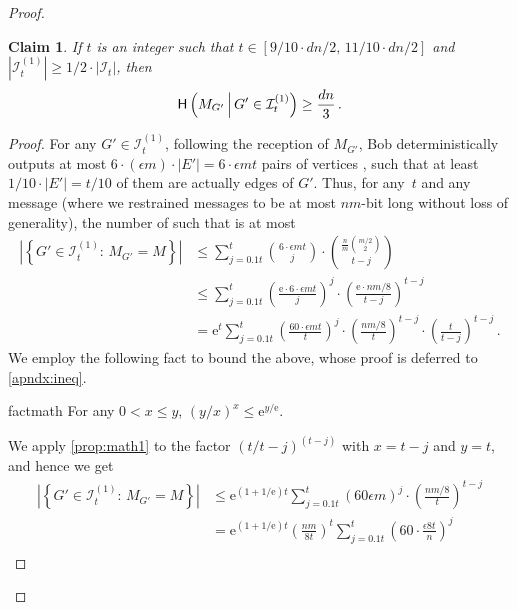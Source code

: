 \documentclass[epsfig,letter,11pt]{article}
\numberwithin{equation}{section}
\newcommand{\eps}{\epsilon}
\newcommand{\e}{\mathrm{e}}
\newcommand{\I}{\mathcal{I}}
\newcommand*{\entropy}{\textup{\textsf{H}}}
\newtheorem{claim}[theorem]{Claim}
\begin{document}
\begin{proof}
	\begin{claim}
			\label{claim:mutualunif}
			If $t$ is an integer such that $t \in [9/10 \cdot dn/2 , \, 11/10 \cdot dn/2]$ and  $|\mathcal{I}^{(1)}_{t}| \ge {1}/{2} \cdot |\mathcal{I}_t| $, then
			\begin{equation*}
				\entropy\left(M_{G'} \, \middle| \, G' \in \I_t^{(1)}\right)  \ge \frac{dn}{3} \, .
			\end{equation*}
	\end{claim}
	\begin{proof}
		For any $G' \in \mathcal{I}^{(1)}_{t}$, following the reception of  $M_{G'}$, Bob deterministically outputs at most  $6\cdot(\eps
		m)\cdot|E'| = 6 \cdot \epsilon m t$ pairs of vertices , such that at least $1/10 \cdot |E'| = t/10$ of them are actually edges of $G'$. Thus, for any~$t$ and any message  (where we restrained messages to be at most $nm$-bit long without loss of generality), the number of  such that  is at most
		\begin{align*}
			\left| \left\{G' \in \mathcal{I}^{(1)}_{t}: \, M_{G'} = M\right\}\right| & \le \sum_{j=0.1 t}^{t} \binom{6 \cdot \epsilon m t}{j} \cdot \binom{\frac{n}{m} \binom{m/2}{2}}{t-j} \\ 
			&\le \sum_{j=0.1 t }^{t} \left(\frac{\e \cdot 6 \cdot \epsilon m t}{j} \right)^j \cdot \left(\frac{\e\cdot nm/8}{t-j}\right)^{t-j}\\
			&= \e^{t} \sum_{j=0.1t}^{t}  \left(\frac{60 \cdot \epsilon m t}{ t} \right)^j \cdot \left(\frac{ nm/8}{t}\right)^{t-j} \cdot \left(\frac{t}{t-j}\right)^{t-j} \, .
		\end{align*}
		We employ the following fact to bound the above, whose proof is deferred to \cref{apndx:ineq}.
		\begin{restatable}{fact}{math}\label{prop:math1}
			For any $0 < x \le y$, $(y/x)^x \le \e^{y/\e}$.
		\end{restatable}
		\noindent
		We apply \cref{prop:math1} to the factor $(t/t-j)^{(t-j)}$ with $x = t-j$ and $y=t$, and hence we get
		\begin{align}
			\left| \left\{G' \in\mathcal{I}^{(1)}_{t}: \, M_{G'} = M\right\}\right| & \le \e^{(1+1/\e)t} \sum_{j=0.1t}^{t}  \left(60 \epsilon m \right)^j \cdot \left(\frac{nm/8}{t}\right)^{t-j}\\
			& =  \e^{(1+1/\e)t} \left(\frac{nm}{8t}\right)^{t} \sum_{j=0.1t}^{t}  \left(60\cdot \frac{\epsilon 8t}{n} \right)^j\\

\end{align}
\end{proof}
\end{proof}
\end{document}
